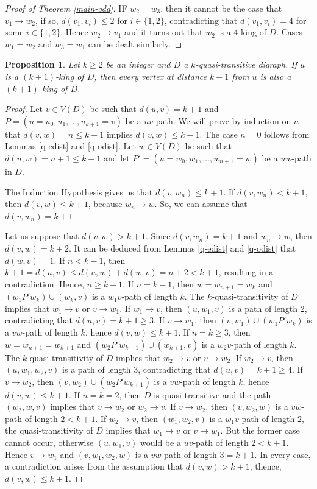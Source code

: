 \documentclass[preprint]{elsarticle}
\newtheorem{prop}[thm]{Proposition}
\begin{document}
\begin{proof}[Proof of Theorem \ref{main-odd}]
	 IF $w_2 = w_3$, then it cannot be the case that $v_1 \to w_2$, if so, $d(v_1, v_i) \le 2$ for $i \in \{ 1, 2 \}$, contradicting that $d(v_1, v_i) = 4$ for some $i \in \{ 1, 2 \}$.   Hence $w_2 \to v_1$ and it turns out that $w_2$ is a $4$-king of $D$.   Cases $w_1 = w_2$ and $w_3 = w_1$ can be dealt similarly.

\end{proof}


\begin{prop}
Let $k \ge 2$ be an integer and $D$ a $k$-quasi-transitive digraph.   If $u$ is a $(k+1)$-king of $D$, then every vertex at distance $k+1$ from $u$ is also a $(k+1)$-king of $D$.
\end{prop}

\begin{proof}
Let $v \in V(D)$ be such that $d(u,v) = k+1$ and $P = (u = u_0, u_1, \dots, u_{k+1} = v)$ be a $uv$-path.   We will prove by induction on $n$ that $d(v,w) = n \le k+1$ implies $d(v,w) \le k+1$.   The case $n = 0$ follows from Lemmas \ref{q-edist} and \ref{q-odist}.   Let $w \in V(D)$ be such that $d(u, w) = n + 1 \le k+1$ and let $P' = (u = w_0, w_1, \dots, w_{n+1} = w)$ be a $uw$-path in $D$.

The Induction Hypothesis gives us that $d(v, w_n) \le k+1$.   If $d(v,w_n) < k+1$, then $d(v, w) \le k+1$, because $w_n \to w$.   So, we can assume that $d(v,w_n) = k+1$.

Let us suppose that $d(v, w) > k+1$.   Since $d(v,w_n) = k+1$ and $w_n \to w$, then $d(v,w)=k+2$.   It can be deduced from Lemmas \ref{q-edist} and \ref{q-odist} that $d(w,v) = 1$.   If $n < k-1$, then $k+1 = d(u,v) \le d(u,w) + d(w,v) = n+2 < k+1$, resulting in a contradiction.   Hence, $n \ge k-1$.   If $n = k-1$, then $w = w_{n+1} = w_k$ and $(w_1 P' w_k) \cup (w_k, v)$ is a $w_1 v$-path of length $k$.   The $k$-quasi-transitivity of $D$ implies that $w_1 \to v$ or $v \to w_1$.   If $w_1 \to v$, then $(u, w_1, v)$ is a path of length $2$, contradicting that $d(u,v) = k+1 \ge 3$.   If $v \to w_1$, then $(v,w_1) \cup (w_1 P' w_k)$ is a $vw$-path of length $k$, hence $d(v,w) \le k+1$.   If $n = k \ge 3$, then $w = w_{n+1} = w_{k+1}$ and $(w_2 P' w_{k+1}) \cup (w_{k+1}, v)$ is a $w_2 v$-path of length $k$.   The $k$-quasi-transitivity of $D$ implies that $w_2 \to v$ or $v \to w_2$.   If $w_2 \to v$, then $(u, w_1, w_2, v)$ is a path of length $3$, contradicting that $d(u,v) = k+1 \ge 4$.   If $v \to w_2$, then $(v,w_2) \cup (w_2 P' w_{k+1})$ is a $vw$-path of length $k$, hence $d(v,w) \le k+1$.   If $n = k = 2$, then $D$ is quasi-transitive and the path $(w_2, w, v)$ implies that $v \to w_2$ or $w_2 \to v$.   If $v \to w_2$, then $(v, w_2, w)$ is a $vw$-path of length $2 < k+1$.   If $w_2 \to v$, then $(w_1, w_2, v)$ is a $w_1 v$-path of length $2$, the quasi-transitivity of $D$ implies that $w_1 \to v$ or $v \to w_1$.   But the former case cannot occur, otherwise $(u, w_1, v)$ would be a $uv$-path of length $2 < k+1$.   Hence $v \to w_1$ and $(v, w_1, w_2, w)$ is a $vw$-path of length $3 = k+1$.   In every case, a contradiction arises from the assumption that $d(v,w) > k+1$, thence, $d(v,w) \le k+1$.
\end{proof}
\end{document}
